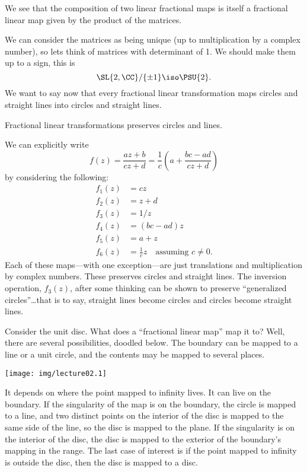 We see that the composition of two linear fractional maps is
itself a fractional linear map given by the product of the
matrices.

We can consider the matrices as being unique (up to
multiplication by a complex number), so lets think of matrices
with determinant of 1. We should make them up to a sign, this is
\begin{equation}
\SL{2,\CC}/\{\pm1\}\iso\PSU{2}.
\end{equation}
We want to say now that every fractional linear transformation
maps circles and straight lines into circles and straight lines.

\begin{thm}
Fractional linear transformations preserves circles and lines.
\end{thm}

We can explicitly write
\begin{equation}
f(z)=\frac{az+b}{cz+d}=\frac{1}{c}\left(a+\frac{bc-ad}{cz+d}\right)
\end{equation}
by considering the following:
\begin{align*}
f_{1}(z) &= cz\\
f_{2}(z) &= z+d\\
f_{3}(z) &= 1/z\\
f_{4}(z) &= (bc-ad)z\\
f_{5}(z) &= a+z\\
f_{6}(z) &= \frac{1}{c}z\quad\mbox{assuming }c\not=0.
\end{align*}
Each of these maps---with one exception---are just translations
and multiplication by complex numbers. These preserves circles
and straight lines. The inversion operation, $f_{3}(z)$, after
some thinking can be shown to preserve ``generalized
circles''\dots that is to say, straight lines become circles and
circles become straight lines.

Consider the unit disc. What does a ``fractional linear map'' map
it to? Well, there are several possibilities, doodled below. The
boundary can be mapped to a line or a unit circle, and the
contents may be mapped to several places.
\begin{center}
\texttt{[image: img/lecture02.1]}
\end{center}
It depends on where the point mapped to infinity lives. It can
live on the boundary. If the singularity of the map is on the
boundary, the circle is mapped to a line, and two distinct points
on the interior of the disc is mapped to the same side of the
line, so the disc is mapped to the plane. If the singularity is
on the interior of the disc, the disc is mapped to the exterior
of the boundary's mapping in the range. The last case of interest
is if the point mapped to infinity is outside the disc, then the
disc is mapped to a disc.

